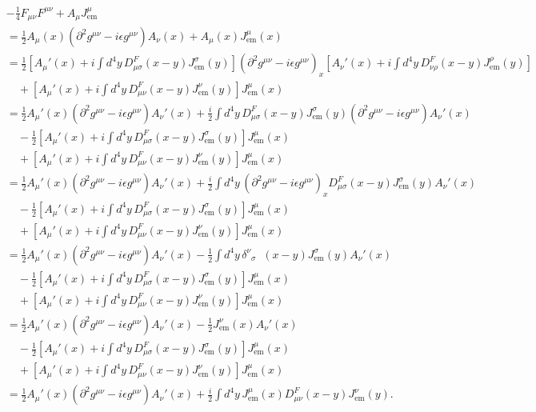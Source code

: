 \begin{align*}
  & - \frac{1}{4} F_{\mu\nu} F^{\mu\nu} + A_\mu J_\text{em}^\mu \\
  &= \frac{1}{2} A_\mu(x) (\partial^2 g^{\mu\nu} - i\epsilon g^{\mu\nu}) A_\nu(x) + A_\mu(x) J_\text{em}^\mu(x) \\
  &= \frac{1}{2} \left[ A_\mu'(x) + i \int d^4y \, D_{\mu\sigma}^F (x-y) J_\text{em}^\sigma (y) \right]
  (\partial^2 g^{\mu\nu} - i\epsilon g^{\mu\nu})_x \left[ A_\nu'(x) + i \int d^4y \, D_{\nu\rho}^F (x-y) J_\text{em}^\rho (y) \right] \\
  & \quad + \left[ A_\mu'(x) + i \int d^4y \, D_{\mu\nu}^F (x-y) J_\text{em}^\nu (y) \right] J_\text{em}^\mu(x) \\
  &= \frac{1}{2} A_\mu'(x) (\partial^2 g^{\mu\nu} - i\epsilon g^{\mu\nu})  A_\nu'(x)
  + \frac{i}{2} \int d^4y \, D_{\mu\sigma}^F (x-y) J_\text{em}^\sigma (y) (\partial^2 g^{\mu\nu} - i\epsilon g^{\mu\nu}) A_\nu'(x) \\
  & \quad - \frac{1}{2} \left[ A_\mu'(x) + i \int d^4y \, D_{\mu\sigma}^F (x-y) J_\text{em}^\sigma (y) \right] J_\text{em}^\mu (x) \\
  & \quad + \left[ A_\mu'(x) + i \int d^4y \, D_{\mu\nu}^F (x-y) J_\text{em}^\nu (y) \right] J_\text{em}^\mu(x) \\
  &= \frac{1}{2} A_\mu'(x) (\partial^2 g^{\mu\nu} - i\epsilon g^{\mu\nu})  A_\nu'(x)
  + \frac{i}{2} \int d^4y \, (\partial^2 g^{\mu\nu} - i\epsilon g^{\mu\nu})_x D_{\mu\sigma}^F (x-y) J_\text{em}^\sigma (y) A_\nu'(x) \\
  & \quad - \frac{1}{2} \left[ A_\mu'(x) + i \int d^4y \, D_{\mu\sigma}^F (x-y) J_\text{em}^\sigma (y) \right] J_\text{em}^\mu (x) \\
  & \quad + \left[ A_\mu'(x) + i \int d^4y \, D_{\mu\nu}^F (x-y) J_\text{em}^\nu (y) \right] J_\text{em}^\mu(x) \\
  &= \frac{1}{2} A_\mu'(x) (\partial^2 g^{\mu\nu} - i\epsilon g^{\mu\nu})  A_\nu'(x)
  - \frac{1}{2} \int d^4y \, \delta^\nu{}_\sigma \mathop{\delta^{(4)}}(x-y) J_\text{em}^\sigma (y) A_\nu'(x) \\
  & \quad - \frac{1}{2} \left[ A_\mu'(x) + i \int d^4y \, D_{\mu\sigma}^F (x-y) J_\text{em}^\sigma (y) \right] J_\text{em}^\mu (x) \\
  & \quad + \left[ A_\mu'(x) + i \int d^4y \, D_{\mu\nu}^F (x-y) J_\text{em}^\nu (y) \right] J_\text{em}^\mu(x) \\
  &= \frac{1}{2} A_\mu'(x) (\partial^2 g^{\mu\nu} - i\epsilon g^{\mu\nu})  A_\nu'(x)
  - \frac{1}{2}  J_\text{em}^\nu (x) A_\nu'(x) \\
  & \quad - \frac{1}{2} \left[ A_\mu'(x) + i \int d^4y \, D_{\mu\sigma}^F (x-y) J_\text{em}^\sigma (y) \right] J_\text{em}^\mu (x) \\
  & \quad + \left[ A_\mu'(x) + i \int d^4y \, D_{\mu\nu}^F (x-y) J_\text{em}^\nu (y) \right] J_\text{em}^\mu(x) \\
  &= \frac{1}{2} A_\mu'(x) (\partial^2 g^{\mu\nu} - i\epsilon g^{\mu\nu})  A_\nu'(x) + \frac{i}{2} \int d^4y \, J_\text{em}^\mu(x) D_{\mu\nu}^F (x-y) J_\text{em}^\nu (y) .
\end{align*}
